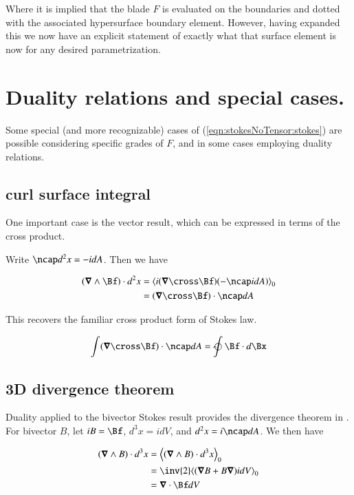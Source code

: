 Where it is implied that the blade $F$ is evaluated on the boundaries and dotted with the associated hypersurface boundary element.  However, having expanded this we now have an explicit statement of exactly what that surface element is now for any desired parametrization.

\section{Duality relations and special cases.}

Some special (and more recognizable) cases of (\ref{eqn:stokesNoTensor:stokes}) are possible considering specific grades of $F$, and in some cases employing duality relations.  

\subsection{curl surface integral}

One important case is the  vector result, which can be expressed in terms of the cross product.

Write $\ncap d^2 x = -i dA$.  Then we have

\begin{align*}
( \spacegrad \wedge \Bf ) \cdot d^2 x
&=
\gpgradezero{ i (\spacegrad \cross \Bf) (- \ncap i dA) } \\
&=
(\spacegrad \cross \Bf) \cdot \ncap dA
\end{align*}

This recovers the familiar cross product form of Stokes law.

\begin{align}
\int (\spacegrad \cross \Bf) \cdot \ncap dA = \ointclockwise \Bf \cdot d\Bx
\end{align}

\subsection{3D divergence theorem}

Duality applied to the bivector Stokes result provides the divergence theorem in .  For bivector $B$, let $iB = \Bf$, $d^3 x = i dV$, and $d^2 x = i \ncap dA$.  We then have

\begin{align*}
( \spacegrad \wedge B ) \cdot d^3 x
&=
\gpgradezero{ ( \spacegrad \wedge B ) \cdot d^3 x } \\
&=
\inv{2} \gpgradezero{ ( \spacegrad B + B \spacegrad ) i dV } \\
&=
\spacegrad \cdot \Bf dV \\
\end{align*}

